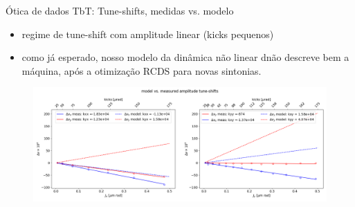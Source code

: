 \begin{frame}{Ótica de dados TbT: Tune-shifts, medidas vs. modelo}

{\footnotesize
\begin{itemize}
    \item regime de tune-shift com amplitude linear (kicks pequenos)
    \item como já esperado, nosso modelo da dinâmica não linear dnão descreve bem a máquina, após a otimização RCDS para novas sintonias.
\end{itemize}
}
\begin{figure}
    \centering
    \includegraphics[scale=0.3]{2024-07-12/figures/model_vs_meas_adts.png}
\end{figure}

\end{frame}